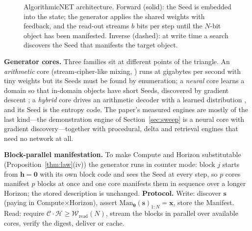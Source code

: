 \documentclass[11pt,a4paper]{article}
\theoremstyle{definition}
\theoremstyle{plain}
\theoremstyle{remark}
\newcommand{\anet}{AlgorithmicNET}
\newcommand{\Comp}{\mathcal{C}}
\newcommand{\Hori}{\mathcal{H}}
\newcommand{\Work}{\mathcal{W}}
\newcommand{\seed}{\mathbf{s}}
\newcommand{\weights}{\bm{\theta}}
\newcommand{\file}{\mathbf{x}}
\begin{document}
\begin{figure}[!htb]
\caption{\anet{} architecture. Forward (solid): the Seed is embedded into the state; the
generator applies the shared weights with feedback, and the read-out streams $b$ bits per
step until the $N$-bit object has been manifested. Inverse (dashed): at write time a search
discovers the Seed that manifests the target object.}
\label{fig:arch}
\end{figure}

\textbf{Generator cores.} Three families sit at different points of the triangle. An
\emph{arithmetic} core (stream-cipher-like mixing, \citealp{bernstein2008chacha}) runs at
gigabytes per second with tiny weights but its Seeds must be found by enumeration; a
\emph{neural} core learns a domain so that in-domain objects have short Seeds, discovered by
gradient descent \citep{dupont2021coin,sitzmann2020siren,mildenhall2020nerf,patil2026embryonical};
a \emph{hybrid} core drives an arithmetic decoder with a learned distribution
\citep{deletang2023}, and its Seed is the entropy code. The paper's measured engines are mostly of the last kind---the demonstration engine of
Section~\ref{sec:sweep} is a neural core with gradient discovery---together with procedural,
delta and retrieval engines that need no network at all.

\textbf{Block-parallel manifestation.} To make Compute and Horizon substitutable
(Proposition~\ref{thm:law}(iv)) the generator runs in counter mode: block $j$ starts from
$\mathbf{h}=\mathbf{0}$ with its own block code and sees the Seed at every step, so $p$ cores
manifest $p$ blocks at once and one core manifests them in sequence over a longer Horizon; the
stored description is unchanged. \textbf{Protocol.} Write: discover $\seed$ (paying in
Compute$\times$Horizon), assert $\mathrm{Man}_{\weights}(\seed)_{1:N}=\file$, store the Manifest.
Read: require $\Comp\cdot\Hori\ge\Work_{\mathrm{read}}(N)$, stream the blocks in parallel over
available cores, verify the digest, deliver or cache.
\end{document}
